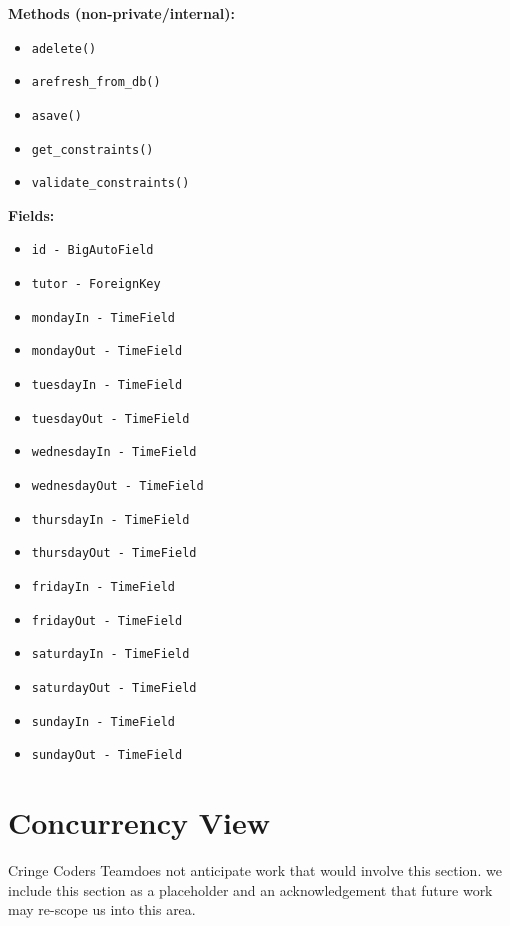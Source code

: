 \documentclass[oneside,openany,obeyspaces]{book}
\newcommand\tab[1][1cm]{\hspace*{#1}}
\newcommand\TeamName{Cringe Coders Team}
\begin{document}
\begin{flushleft}
    \textbf{Methods (non-private/internal):}
    \begin{itemize}
        \item \texttt{adelete()}
        \item \texttt{arefresh\_from\_db()}
        \item \texttt{asave()}
        \item \texttt{get\_constraints()}
        \item \texttt{validate\_constraints()}
    \end{itemize}

    \textbf{Fields:}
    \begin{itemize}
        \item \texttt{id - BigAutoField}
        \item \texttt{tutor - ForeignKey}
        \item \texttt{mondayIn - TimeField}
        \item \texttt{mondayOut - TimeField}
        \item \texttt{tuesdayIn - TimeField}
        \item \texttt{tuesdayOut - TimeField}
        \item \texttt{wednesdayIn - TimeField}
        \item \texttt{wednesdayOut - TimeField}
        \item \texttt{thursdayIn - TimeField}
        \item \texttt{thursdayOut - TimeField}
        \item \texttt{fridayIn - TimeField}
        \item \texttt{fridayOut - TimeField}
        \item \texttt{saturdayIn - TimeField}
        \item \texttt{saturdayOut - TimeField}
        \item \texttt{sundayIn - TimeField}
        \item \texttt{sundayOut - TimeField}
    \end{itemize}

    \section{Concurrency View}

    \tab \TeamName\space does not anticipate work that would involve this section. we include this section as a placeholder and an acknowledgement that future work may re-scope us into this area.\\~\\



\end{flushleft}
\end{document}
